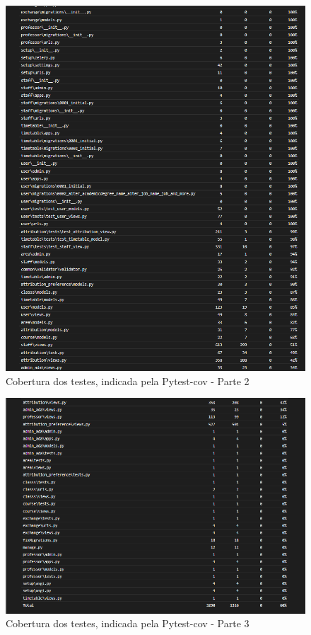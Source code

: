\documentclass[12pt]{article}
\begin{document}
\begin{figure}[h]
    \centering
    \includegraphics[width=1\textwidth]{coberturaparte2.png}
    \caption{Cobertura dos testes, indicada pela Pytest-cov - Parte 2}
    \label{fig:cobertura2}
\end{figure}
\begin{figure}[h]
    \centering
    \includegraphics[width=1\textwidth]{coberturaparte3.png}
    \caption{Cobertura dos testes, indicada pela Pytest-cov - Parte 3}
    \label{fig:cobertura3}
\end{figure}
\end{document}
